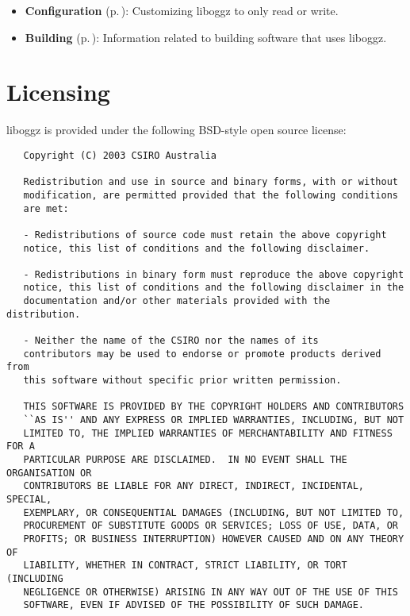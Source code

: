 \begin{itemize}
\item {\bf Configuration }{\rm (p.\,\pageref{group__configuration})}: Customizing liboggz to only read or write.\end{itemize}


\begin{itemize}
\item {\bf Building }{\rm (p.\,\pageref{group__building})}: Information related to building software that uses liboggz.\end{itemize}
\section{Licensing}\label{Licensing}
liboggz is provided under the following BSD-style open source license:



\footnotesize\begin{verbatim}   Copyright (C) 2003 CSIRO Australia

   Redistribution and use in source and binary forms, with or without
   modification, are permitted provided that the following conditions
   are met:
   
   - Redistributions of source code must retain the above copyright
   notice, this list of conditions and the following disclaimer.
   
   - Redistributions in binary form must reproduce the above copyright
   notice, this list of conditions and the following disclaimer in the
   documentation and/or other materials provided with the distribution.
   
   - Neither the name of the CSIRO nor the names of its
   contributors may be used to endorse or promote products derived from
   this software without specific prior written permission.
   
   THIS SOFTWARE IS PROVIDED BY THE COPYRIGHT HOLDERS AND CONTRIBUTORS
   ``AS IS'' AND ANY EXPRESS OR IMPLIED WARRANTIES, INCLUDING, BUT NOT
   LIMITED TO, THE IMPLIED WARRANTIES OF MERCHANTABILITY AND FITNESS FOR A
   PARTICULAR PURPOSE ARE DISCLAIMED.  IN NO EVENT SHALL THE ORGANISATION OR
   CONTRIBUTORS BE LIABLE FOR ANY DIRECT, INDIRECT, INCIDENTAL, SPECIAL,
   EXEMPLARY, OR CONSEQUENTIAL DAMAGES (INCLUDING, BUT NOT LIMITED TO,
   PROCUREMENT OF SUBSTITUTE GOODS OR SERVICES; LOSS OF USE, DATA, OR
   PROFITS; OR BUSINESS INTERRUPTION) HOWEVER CAUSED AND ON ANY THEORY OF
   LIABILITY, WHETHER IN CONTRACT, STRICT LIABILITY, OR TORT (INCLUDING
   NEGLIGENCE OR OTHERWISE) ARISING IN ANY WAY OUT OF THE USE OF THIS
   SOFTWARE, EVEN IF ADVISED OF THE POSSIBILITY OF SUCH DAMAGE.

\end{verbatim}
\normalsize
 